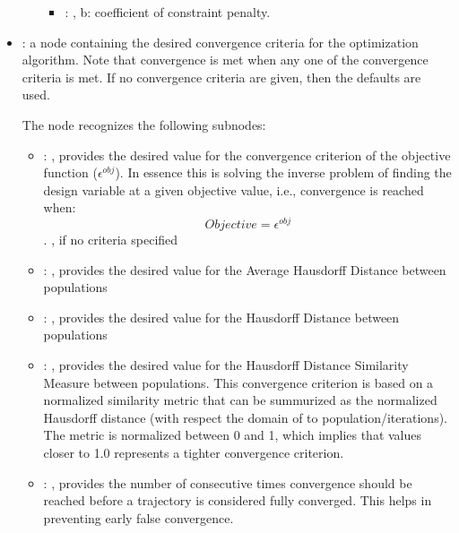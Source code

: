 \begin{itemize}
\begin{itemize}
\begin{itemize}
            \item {}: , 
              b: coefficient of constraint penalty.
          \end{itemize}
      \end{itemize}

    \item {}:
      a node containing the desired convergence criteria for the optimization algorithm.
      Note that convergence is met when any one of the convergence criteria is met. If no
      convergence               criteria are given, then the defaults are used.

      The  node recognizes the following subnodes:
      \begin{itemize}
        \item {}: , 
          provides the desired value for the convergence criterion of the objective function
          ($\epsilon^{obj}$). In essence this is solving the inverse problem of finding the design
          variable                         at a given objective value, i.e., convergence is reached
          when: $$ Objective = \epsilon^{obj}$$.                        , if no
          criteria specified

        \item {}: , 
          provides the desired value for the Average Hausdorff Distance between populations

        \item {}: , 
          provides the desired value for the Hausdorff Distance between populations

        \item {}: , 
          provides the desired value for the Hausdorff Distance Similarity Measure between
          populations.                                     This convergence criterion is based on a
          normalized                                     similarity metric that can be summurized as
          the normalized Hausdorff distance                                     (with respect the
          domain of to population/iterations). The metric is normalized between 0 and 1,
          which implies that values closer to 1.0 represents a tighter convergence criterion.

        \item {}: , 
          provides the number of consecutive times convergence should be reached before a trajectory
          is considered fully converged. This helps in preventing early false convergence.
      \end{itemize}


\end{itemize}
